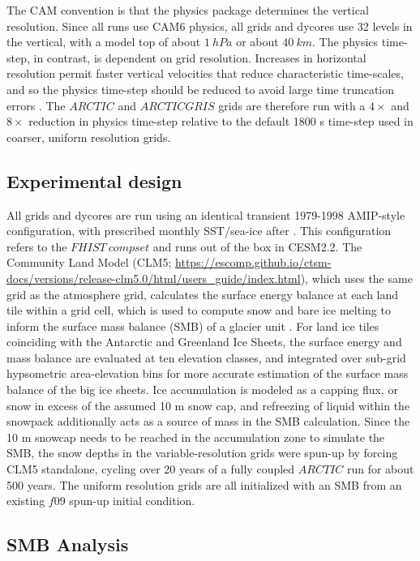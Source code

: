 \documentclass[draft]{agujournal2019}
\begin{document}
The CAM convention is that the physics package determines the vertical resolution. Since all runs use CAM6 physics, all grids and dycores use 32 levels in the vertical, with a model top of about $1 \ hPa$ or about $40 \ km$. The physics time-step, in contrast, is dependent on grid resolution. Increases in horizontal resolution permit faster vertical velocities that reduce characteristic time-scales, and so the physics time-step should be reduced to avoid large time truncation errors \cite{HR2018JAMES}. The $ARCTIC$ and $ARCTICGRIS$ grids are therefore run with a $4\times$ and $8\times$ reduction in physics time-step relative to the default 1800 s time-step used in coarser, uniform resolution grids.

\subsection{Experimental design}

All grids and dycores are run using an identical transient 1979-1998 AMIP-style configuration, with prescribed monthly SST/sea-ice after \cite{CESMSST}. This configuration refers to the $FHIST \ compset$ and runs out of the box in CESM2.2. The Community Land Model (CLM5; \url{https://escomp.github.io/ctsm-docs/versions/release-clm5.0/html/users_guide/index.html}), which uses the same grid as the atmosphere grid, calculates the surface energy balance at each land tile within a grid cell, which is used to compute snow and bare ice melting to inform the surface mass balance (SMB) of a glacier unit \cite{VKETAL2020JGR}. For land ice tiles coinciding with the Antarctic and Greenland Ice Sheets, the surface energy and mass balance are evaluated at ten elevation classes, and integrated over sub-grid hypsometric area-elevation bins for more accurate estimation of the surface mass balance of the big ice sheets. Ice accumulation is modeled as a capping flux, or snow in excess of the assumed 10 m snow cap, and refreezing of liquid within the snowpack additionally acts as a source of mass in the SMB calculation. Since the 10 m snowcap needs to be reached in the accumulation zone to simulate the SMB, the snow depths in the variable-resolution grids were spun-up  by forcing CLM5 standalone, cycling over 20 years of a fully coupled $ARCTIC$ run for about 500 years. The uniform resolution grids are all initialized with an SMB from an existing $f09$ spun-up initial condition. 

\subsection{SMB Analysis}
\end{document}
